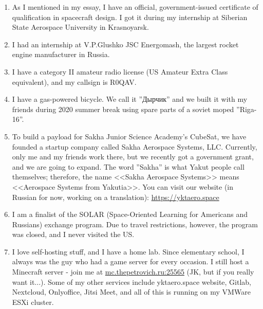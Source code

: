 \documentclass[letter,11pt]{article}
\begin{document}
    \begin{justify}
        \begin{enumerate}
            \item As I mentioned in my essay, I have an official, government-issued certificate of qualification in spacecraft design. I got it during my internship at Siberian State Aerospace University in Krasnoyarsk.

            \item I had an internship at V.P.Glushko JSC Energomash, the largest rocket engine manufacturer in Russia.
            
            \item I have a category II amateur radio license (US Amateur Extra Class equivalent), and my callsign is R0QAV.
            
            \item I have a gas-powered bicycle. We call it ''Дырчик'' and we built it with my friends during 2020 summer break using spare parts of a soviet moped ''Riga-16''.
            
            \item To build a payload for Sakha Junior Science Academy's CubeSat, we have founded a startup company called Sakha Aerospace Systems, LLC. Currently, only me and my friends work there, but we recently got a government grant, and we are going to expand. The word ''Sakha'' is what Yakut people call themselves; therefore, the name <<Sakha Aerospace Systems>> means <<Aerospace Systems from Yakutia>>. You can visit our website (in Russian for now, working on a translation): \url{https://yktaero.space}
            
            \item I am a finalist of the SOLAR (Space-Oriented Learning for Americans and Russians) exchange program. Due to travel restrictions, however, the program was closed, and I never visited the US.
            
            \item I love self-hosting stuff, and I have a home lab. Since elementary school, I always was the guy who had a game server for every occasion. I still host a Minecraft server - join me at \url{mc.thepetrovich.ru:25565} (JK, but if you really want it...). Some of my other services include yktaero.space website, Gitlab, Nextcloud, Onlyoffice, Jitsi Meet, and all of this is running on my VMWare ESXi cluster.
        \end{enumerate}
    \end{justify}
\end{document}
